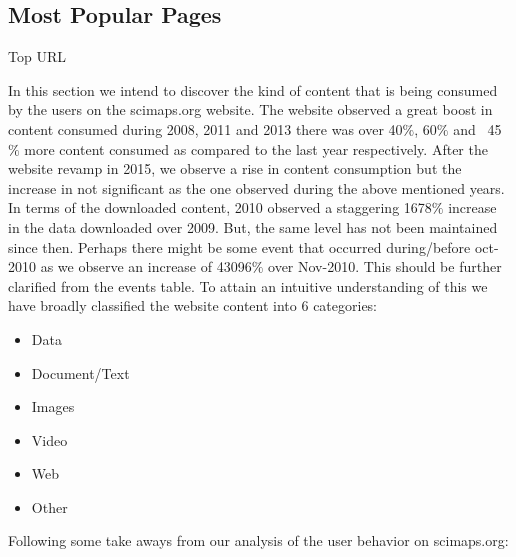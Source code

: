 \subsection{Most Popular Pages} \label{viztoppages}
Top URL

In this section we intend to discover the kind of content that is being consumed by the users on the scimaps.org website. 
The website observed a great boost in content consumed during 2008, 2011 and 2013 there was over 40$\%$, 60$\%$ and ~45$\%$ more content consumed as compared to the last year respectively. After the website revamp in 2015, we observe a rise in content consumption but the increase in not significant as the one observed during the above mentioned years. 
In terms of the downloaded content, 2010 observed a staggering 1678$\%$ increase in the data downloaded over 2009. But, the same level has not been maintained since then. Perhaps there might be some event that occurred during/before oct-2010 as we observe an increase of 43096$\%$ over Nov-2010. This should be further clarified from the events table.
To attain an intuitive understanding of this we have broadly classified the website content into 6 categories:
\begin{itemize}
\item Data
\item Document/Text
\item Images
\item Video
\item Web
\item Other
\end{itemize}
Following some take aways from our analysis of the user behavior on scimaps.org: 
